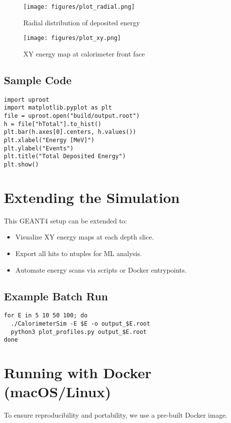\documentclass[11pt]{article}
\begin{document}
\begin{figure}[h!]
  \centering
  \texttt{[image: figures/plot\_radial.png]}
  \caption{Radial distribution of deposited energy}
\end{figure}

\begin{figure}[h!]
  \centering
  \texttt{[image: figures/plot\_xy.png]}
  \caption{XY energy map at calorimeter front face}
\end{figure}

\subsection*{Sample Code}
\begin{verbatim}
import uproot
import matplotlib.pyplot as plt
file = uproot.open("build/output.root")
h = file["hTotal"].to_hist()
plt.bar(h.axes[0].centers, h.values())
plt.xlabel("Energy [MeV]")
plt.ylabel("Events")
plt.title("Total Deposited Energy")
plt.show()
\end{verbatim}

\section{Extending the Simulation}

This GEANT4 setup can be extended to:
\begin{itemize}
  \item Visualize XY energy maps at each depth slice.
  \item Export all hits to ntuples for ML analysis.
  \item Automate energy scans via scripts or Docker entrypoints.
\end{itemize}

\subsection*{Example Batch Run}
\begin{verbatim}
for E in 5 10 50 100; do
  ./CalorimeterSim -E $E -o output_$E.root
  python3 plot_profiles.py output_$E.root
done
\end{verbatim}

\section{Running with Docker (macOS/Linux)}

To ensure reproducibility and portability, we use a pre-built Docker image.
\end{document}
